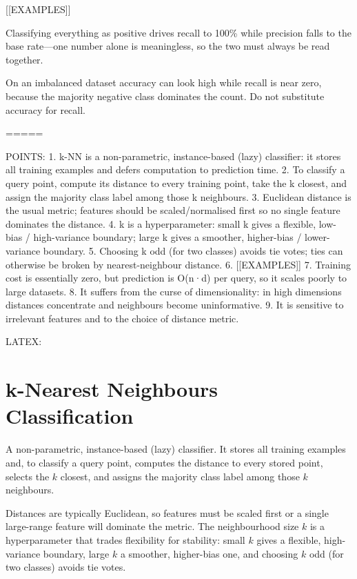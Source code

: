 [[EXAMPLES]]

Classifying everything as positive drives recall to 100\% while precision falls to the base rate---one number alone is meaningless, so the two must always be read together.

\begin{trapbox}
On an imbalanced dataset accuracy can look high while recall is near zero, because the majority negative class dominates the count. Do not substitute accuracy for recall.
\end{trapbox}

=====

POINTS:
1. k-NN is a non-parametric, instance-based (lazy) classifier: it stores all training examples and defers computation to prediction time.
2. To classify a query point, compute its distance to every training point, take the k closest, and assign the majority class label among those k neighbours.
3. Euclidean distance is the usual metric; features should be scaled/normalised first so no single feature dominates the distance.
4. k is a hyperparameter: small k gives a flexible, low-bias / high-variance boundary; large k gives a smoother, higher-bias / lower-variance boundary.
5. Choosing k odd (for two classes) avoids tie votes; ties can otherwise be broken by nearest-neighbour distance.
6. [[EXAMPLES]]
7. Training cost is essentially zero, but prediction is O(n·d) per query, so it scales poorly to large datasets.
8. It suffers from the curse of dimensionality: in high dimensions distances concentrate and neighbours become uninformative.
9. It is sensitive to irrelevant features and to the choice of distance metric.

LATEX:
\section{k-Nearest Neighbours Classification}

\begin{defbox}
A non-parametric, instance-based (lazy) classifier. It stores all training examples and, to classify a query point, computes the distance to every stored point, selects the $k$ closest, and assigns the majority class label among those $k$ neighbours.
\end{defbox}

Distances are typically Euclidean, so features must be scaled first or a single large-range feature will dominate the metric. The neighbourhood size $k$ is a hyperparameter that trades flexibility for stability: small $k$ gives a flexible, high-variance boundary, large $k$ a smoother, higher-bias one, and choosing $k$ odd (for two classes) avoids tie votes.

